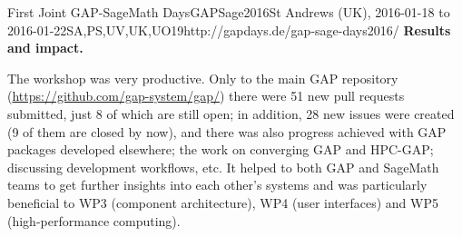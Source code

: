 \begin{event}{First Joint GAP-SageMath Days}{GAPSage2016}{St Andrews (UK),
2016-01-18 to 2016-01-22}{SA,PS,UV,UK,UO}{19}{http://gapdays.de/gap-sage-days2016/}
\textbf{Results and impact.} 

The workshop was very productive. Only to the main GAP repository 
(\url{https://github.com/gap-system/gap/}) there were 51 new pull 
requests submitted, just 8 of which are still open; in addition,
28 new issues were created (9 of them are closed by now), and 
there was also progress achieved with GAP packages developed 
elsewhere; the work on converging GAP and HPC-GAP; discussing 
development workflows, etc. It helped to both GAP and SageMath 
teams to get further insights into each other's systems and was 
particularly beneficial to WP3 (component architecture), WP4 
(user interfaces) and WP5 (high-performance computing). 

\end{event}
